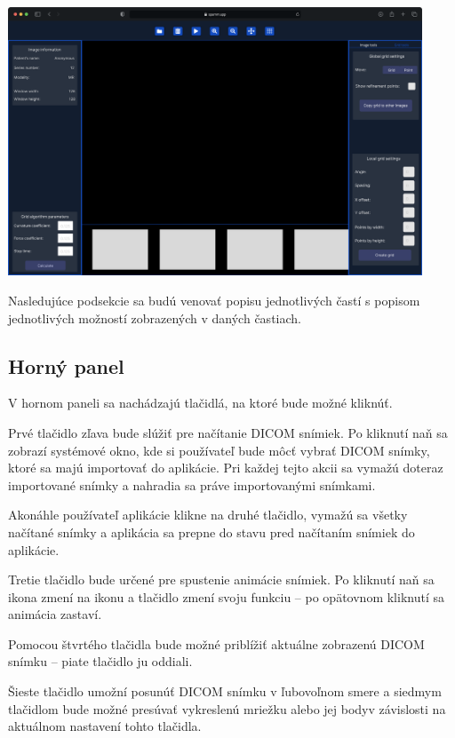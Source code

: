 \begin {center}
\centering
\includegraphics[height=8cm]{media/wireframes/2.png}
\captionsetup{justification=centering}
\end {center}

Nasledujúce podsekcie sa budú venovať popisu jednotlivých častí s popisom jednotlivých možností zobrazených v daných častiach.

\subsection {Horný panel}
V hornom paneli sa nachádzajú tlačidlá, na ktoré bude možné kliknúť.

Prvé tlačidlo zľava bude slúžiť pre načítanie DICOM snímiek. Po kliknutí naň sa zobrazí systémové okno, kde si používateľ bude môcť vybrať DICOM snímky, ktoré sa majú importovať do aplikácie. Pri každej tejto akcii sa vymažú doteraz importované snímky a nahradia sa práve importovanými snímkami.

Akonáhle používateľ aplikácie klikne na druhé tlačidlo, vymažú sa všetky načítané snímky a aplikácia sa prepne do stavu pred načítaním snímiek do aplikácie.

Tretie tlačidlo bude určené pre spustenie animácie snímiek. Po kliknutí naň sa ikona zmení na  ikonu a tlačidlo zmení svoju funkciu -- po opätovnom kliknutí sa animácia zastaví.

Pomocou štvrtého tlačidla bude možné priblížiť aktuálne zobrazenú DICOM snímku -- piate tlačidlo ju oddiali.

Šieste tlačidlo umožní posunúť DICOM snímku v ľubovoľnom smere a siedmym tlačidlom bude možné presúvať vykreslenú mriežku alebo jej body\newline v závislosti na aktuálnom nastavení tohto tlačidla.

